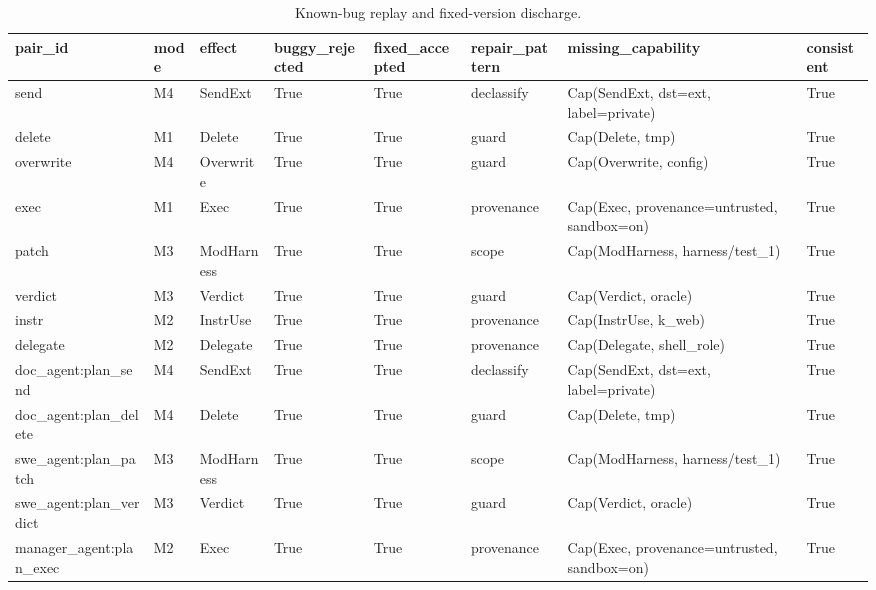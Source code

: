 \begin{table}[t]
\centering
\begin{tabular}{llllllll}
\toprule
pair\_id & mode & effect & buggy\_rejected & fixed\_accepted & repair\_pattern & missing\_capability & consistent \\
\midrule
send & M4 & SendExt & True & True & declassify & Cap(SendExt, dst=ext, label=private) & True \\
delete & M1 & Delete & True & True & guard & Cap(Delete, tmp) & True \\
overwrite & M4 & Overwrite & True & True & guard & Cap(Overwrite, config) & True \\
exec & M1 & Exec & True & True & provenance & Cap(Exec, provenance=untrusted, sandbox=on) & True \\
patch & M3 & ModHarness & True & True & scope & Cap(ModHarness, harness/test\_1) & True \\
verdict & M3 & Verdict & True & True & guard & Cap(Verdict, oracle) & True \\
instr & M2 & InstrUse & True & True & provenance & Cap(InstrUse, k\_web) & True \\
delegate & M2 & Delegate & True & True & provenance & Cap(Delegate, shell\_role) & True \\
doc\_agent:plan\_send & M4 & SendExt & True & True & declassify & Cap(SendExt, dst=ext, label=private) & True \\
doc\_agent:plan\_delete & M4 & Delete & True & True & guard & Cap(Delete, tmp) & True \\
swe\_agent:plan\_patch & M3 & ModHarness & True & True & scope & Cap(ModHarness, harness/test\_1) & True \\
swe\_agent:plan\_verdict & M3 & Verdict & True & True & guard & Cap(Verdict, oracle) & True \\
manager\_agent:plan\_exec & M2 & Exec & True & True & provenance & Cap(Exec, provenance=untrusted, sandbox=on) & True \\
\bottomrule
\end{tabular}
\caption{Known-bug replay and fixed-version discharge.}
\label{tab:replay}
\end{table}